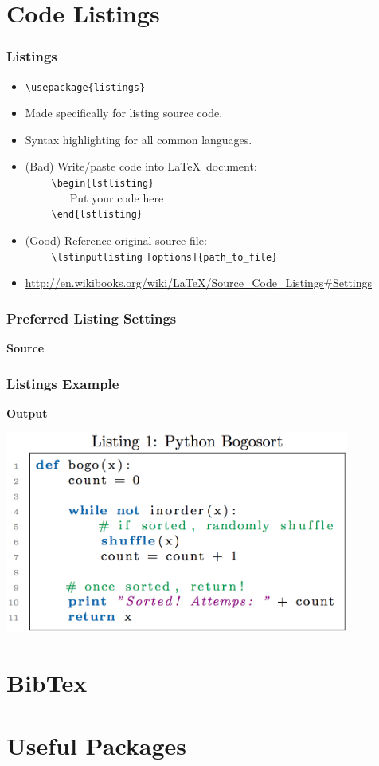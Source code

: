 \documentclass{beamer}
\newcommand{\codeframe}[4]
{
    \begin{frame} \frametitle{#1}
        \begin{columns}[T]
            \column{.52\textwidth}
                \textbf{Source}
                
            \column{.46\textwidth}
                \textbf{Output}
                \fbox{\texttt{[image: Examples/\#2.png]}}
        \end{columns}
    \end{frame}
}
\newcommand{\pc}[1]
{
    \texttt{\textbackslash #1}
}
\newcommand{\pca}[2]
{
    \texttt{\textbackslash #1\{#2\}}
}
\begin{document}
\section{Code Listings}
    \begin{frame}
    \frametitle{Listings}
    \begin{itemize}
    	\item \pca{usepackage}{listings}
        \item Made specifically for listing source code. 
        \item Syntax highlighting for all common languages.
        \item (Bad) Write/paste code into \LaTeX\ document: \\
        \ \ \ \ \pca{begin}{lstlisting}\\ \ \ \ \ \ \ \ \ Put your code here\\ \ \ \ \ \pca{end}{lstlisting}
        \item (Good) Reference original source file: \\
        \ \ \ \ \pc{lstinputlisting}\texttt{[options]\{path\_to\_file\}}
        \item \url{http://en.wikibooks.org/wiki/LaTeX/Source\_Code\_Listings\#Settings}
    \end{itemize}
\end{frame}

\begin{frame} \frametitle{Preferred Listing Settings}
    \textbf{Source}\\
    
\end{frame}

\begin{frame} \frametitle{Listings Example}
	\textbf{Output}\\
	\begin{center}
	\includegraphics[width=0.85\textwidth]{Examples/9-listings.png}
	\end{center}
\end{frame}


\section{BibTex}

\section{Useful Packages}
\end{document}
